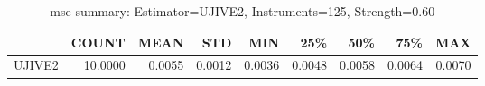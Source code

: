 \begin{table}[ht]
\centering
\caption{mse summary: Estimator=UJIVE2, Instruments=125, Strength=0.60}
\begin{tabular}{lrrrrrrrr}
\toprule
 & COUNT & MEAN & STD & MIN & 25\% & 50\% & 75\% & MAX \\
\midrule
UJIVE2 & 10.0000 & 0.0055 & 0.0012 & 0.0036 & 0.0048 & 0.0058 & 0.0064 & 0.0070 \\
\bottomrule
\end{tabular}
\end{table}
